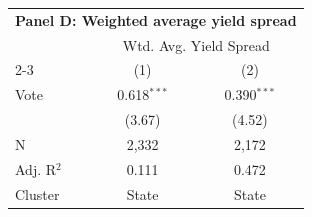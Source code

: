 \begingroup
\centering
\begin{tabular*}{\textwidth}{@{\extracolsep{\fill}}lcc}
\multicolumn{3}{l}{\textbf{Panel D: Weighted average yield spread}}\\

\addlinespace
   \toprule
    & \multicolumn{2}{c}{Wtd. Avg. Yield Spread}\\
   \cmidrule(lr){2-3}
                  & (1)           & (2)\\  
   \midrule 
   Vote           & 0.618$^{***}$ & 0.390$^{***}$\\   
                  & (3.67)       & (4.52)\\   
   \hline
   N   & 2,332         & 2,172\\  
   Adj. R$^2$ & 0.111         & 0.472\\  
   Cluster              & State & State\\  
   \bottomrule
\end{tabular*}
\par\endgroup

